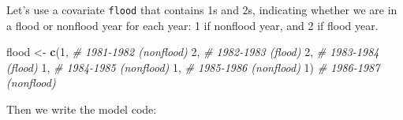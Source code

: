 \documentclass[
  12pt,
]{krantz}
\newenvironment{Shaded}{\begin{snugshade}}{\end{snugshade}}
\newcommand{\CommentTok}[1]{\textcolor[rgb]{0.56,0.35,0.01}{\textit{#1}}}
\newcommand{\DecValTok}[1]{\textcolor[rgb]{0.00,0.00,0.81}{#1}}
\newcommand{\FunctionTok}[1]{\textcolor[rgb]{0.13,0.29,0.53}{\textbf{#1}}}
\newcommand{\NormalTok}[1]{#1}
\newcommand{\OtherTok}[1]{\textcolor[rgb]{0.56,0.35,0.01}{#1}}
\begin{document}
Let's use a covariate \texttt{flood} that contains 1s and 2s, indicating whether we are in a flood or nonflood year for each year: 1 if nonflood year, and 2 if flood year.

\begin{Shaded}
\begin{Highlighting}[]
\NormalTok{flood }\OtherTok{\textless{}{-}} \FunctionTok{c}\NormalTok{(}\DecValTok{1}\NormalTok{, }\CommentTok{\# 1981{-}1982 (nonflood)}
           \DecValTok{2}\NormalTok{, }\CommentTok{\# 1982{-}1983 (flood)}
           \DecValTok{2}\NormalTok{, }\CommentTok{\# 1983{-}1984 (flood)}
           \DecValTok{1}\NormalTok{, }\CommentTok{\# 1984{-}1985 (nonflood)}
           \DecValTok{1}\NormalTok{, }\CommentTok{\# 1985{-}1986 (nonflood)}
           \DecValTok{1}\NormalTok{) }\CommentTok{\# 1986{-}1987 (nonflood)}
\end{Highlighting}
\end{Shaded}

Then we write the model code:
\end{document}
